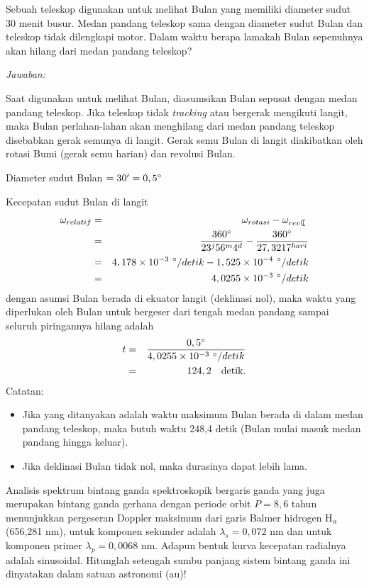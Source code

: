 \documentclass[11pt,fleqn, a4paper]{exam}
\begin{document}
\begin{questions}
\vspace{0.5cm}
\question Sebuah teleskop digunakan untuk melihat Bulan yang memiliki diameter sudut 30 menit busur. Medan pandang teleskop sama dengan diameter sudut Bulan dan teleskop tidak dilengkapi motor. Dalam waktu berapa lamakah Bulan sepenuhnya akan hilang dari medan pandang teleskop?

\textit{Jawaban:}

Saat digunakan untuk melihat Bulan, diasumsikan Bulan sepusat dengan medan pandang teleskop. Jika teleskop tidak \textit{tracking} atau bergerak mengikuti langit, maka Bulan perlahan-lahan akan menghilang dari medan pandang teleskop disebabkan gerak semunya di langit. Gerak semu Bulan di langit diakibatkan oleh rotasi Bumi (gerak semu harian) dan revolusi Bulan.

Diameter sudut Bulan $= 30' = 0,5\degree$

Kecepatan sudut Bulan di langit
\begin{eqnarray*}
\omega_{relatif} &=& \omega_{rotasi} - \omega_{rev \leftmoon}\\
&=& \frac{360\degree}{23^j56^m4^d} - \frac{360\degree}{27,3217^{hari}}\\
&=& 4,178 \times 10^{-3} ~\degree / detik - 1,525 \times 10^{-4} ~\degree / detik\\
&=& 4,0255 \times 10^{-3}  ~\degree / detik
\end{eqnarray*}
dengan asumsi Bulan berada di ekuator langit (deklinasi nol), maka waktu yang diperlukan oleh Bulan untuk bergeser dari tengah medan pandang sampai seluruh piringannya hilang adalah
\begin{eqnarray*}
t &=& \frac{0,5 \degree}{4,0255 \times 10^{-3}  ~\degree / detik}\\
&=& 124,2 \quad \text{detik}.
\end{eqnarray*}
Catatan: 
\begin{itemize}
\item Jika yang ditanyakan adalah waktu maksimum Bulan berada di dalam medan pandang teleskop, maka butuh waktu 248,4 detik (Bulan mulai masuk medan pandang hingga keluar).
\item Jika deklinasi Bulan tidak nol, maka durasinya dapat lebih lama.
\end{itemize}


\vspace{0.5cm}
\question Analisis spektrum bintang ganda spektroskopik bergaris ganda yang juga merupakan bintang ganda gerhana dengan periode orbit $P=8,6$ tahun menunjukkan pergeseran Doppler maksimum dari garis Balmer hidrogen H$_{\alpha}$ (656,281 nm), untuk komponen sekunder adalah $\lambda_s=0,072$ nm dan untuk komponen primer $\lambda_p=0,0068$ nm. Adapun bentuk kurva kecepatan radialnya adalah sinusoidal. Hitunglah setengah sumbu panjang sistem bintang ganda ini dinyatakan dalam satuan astronomi (au)!


\end{questions}
\end{document}
